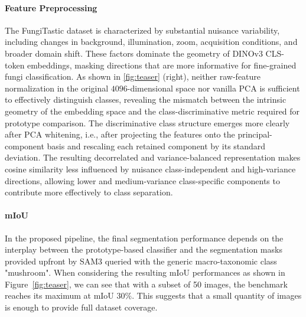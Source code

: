 \paragraph{Feature Preprocessing} The FungiTastic dataset is characterized by substantial nuisance variability, including changes in background, illumination, zoom, acquisition conditions, and broader domain shift. These factors dominate the geometry of DINOv3 CLS-token embeddings, masking directions that are more informative for fine-grained fungi classification. As shown in \ref{fig:teaser} (right), neither raw-feature normalization in the original $4096$-dimensional space nor vanilla PCA is sufficient to effectively distinguish classes, revealing the mismatch between the intrinsic geometry of the embedding space and the class-discriminative metric required for prototype comparison. The discriminative class structure emerges more clearly after PCA whitening, i.e., after projecting the features onto the principal-component basis and rescaling each retained component by its standard deviation. The resulting decorrelated and variance-balanced representation makes cosine similarity less influenced by nuisance class-independent and high-variance directions, allowing lower and medium-variance class-specific components to contribute more effectively to class separation.


\paragraph{mIoU}
In the proposed pipeline, the final segmentation performance depends on the interplay between the prototype-based classifier and the segmentation masks provided upfront by SAM3 queried with the generic macro-taxonomic class "mushroom".  
When considering the resulting mIoU performances as shown in Figure~\ref{fig:teaser}, we can see that with a subset of 50 images, the benchmark reaches its maximum at mIoU $30\%$. This suggests that a small quantity of images is enough to provide full dataset coverage.  %



